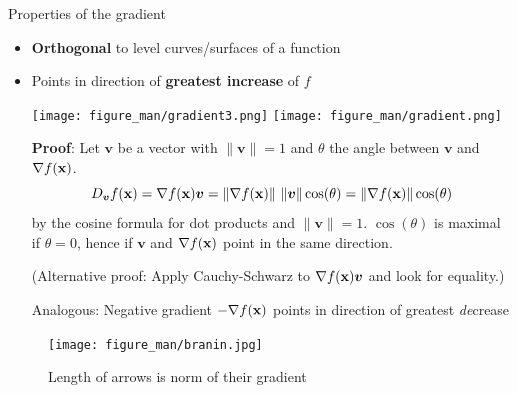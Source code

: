 \documentclass[11pt,compress,t,notes=noshow, xcolor=table]{beamer}
\begin{document}
\begin{vbframe}{Properties of the gradient}

\begin{itemize}
	\item \textbf{Orthogonal} to level curves/surfaces of a function
	\item Points in direction of \textbf{greatest increase} of $f$
	\begin{center}
		\texttt{[image: figure\_man/gradient3.png]} \texttt{[image: figure\_man/gradient.png]}
	\end{center}
	\begin{footnotesize}
    	\textbf{Proof}: Let $\bm{v}$ be a vector with $\|\bm{v}\|=1$ and $\theta$ the angle between $\bm{v}$ and $\nabla f(\mathbf{x})$.
        \begin{equation*}
            D_{\bm{v}}f(\mathbf{x}) = \nabla f(\mathbf{x}) \bm{v} = \|\nabla f(\mathbf{x})\|~\|\bm{v}\|\cos(\theta) = \|\nabla f(\mathbf{x})\| \cos(\theta)
        \end{equation*}
    	by the cosine formula for dot products and $\|\bm{v}\| = 1$.
        $\cos(\theta)$ is maximal if $\theta = 0$, hence if $\bm{v}$ and $\nabla f(\mathbf{x})$ point in the same direction.

    	(Alternative proof: Apply Cauchy-Schwarz to $\nabla f(\mathbf{x}) \bm{v}$ and look for equality.)

        Analogous: Negative gradient $- \nabla f(\mathbf{x})$ points in direction of greatest \textit{de}crease
	\end{footnotesize}
\end{itemize}

\framebreak

\begin{figure}
    \centering
    \texttt{[image: figure\_man/branin.jpg]}
    \caption*{Length of arrows is norm of their gradient}
\end{figure}

\end{vbframe}
\end{document}
